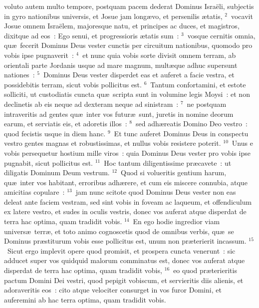 \bchapter
{}voluto autem multo tempore, postquam pacem dederat Dominus Isra\"eli, subjectis in gyro nationibus universis, et Josue jam long\ae vo, et persenilis \ae tatis,
${}^{2}$~vocavit Josue omnem Isra\"elem, majoresque natu, et principes ac duces, et magistros, dixitque ad eos~: Ego senui, et progressioris \ae tatis sum~:
${}^{3}$~vosque cernitis omnia, qu\ae\ fecerit Dominus Deus vester cunctis per circuitum nationibus, quomodo pro vobis ipse pugnaverit~:
${}^{4}$~et nunc quia vobis sorte divisit omnem terram, ab orientali parte Jordanis usque ad mare magnum, mult\ae que adhuc supersunt nationes~:
${}^{5}$~Dominus Deus vester disperdet eas et auferet a facie vestra, et possidebitis terram, sicut vobis pollicitus est.
${}^{6}$~Tantum confortamini, et estote solliciti, ut custodiatis cuncta qu\ae\ scripta sunt in volumine legis Moysi~: et non declinetis ab eis neque ad dexteram neque ad sinistram~:
${}^{7}$~ne postquam intraveritis ad gentes qu\ae\ inter vos futur\ae\ sunt, juretis in nomine deorum earum, et serviatis eis, et adoretis illos~:
${}^{8}$~sed adh\ae reatis Domino Deo vestro~: quod fecistis usque in diem hanc.
${}^{9}$~Et tunc auferet Dominus Deus in conspectu vestro gentes magnas et robustissimas, et nullus vobis resistere poterit.
${}^{10}$~Unus e vobis persequetur hostium mille viros~: quia Dominus Deus vester pro vobis ipse pugnabit, sicut pollicitus est.
${}^{11}$~Hoc tantum diligentissime pr\ae cavete~: ut diligatis Dominum Deum vestrum.
${}^{12}$~Quod si volueritis gentium harum, qu\ae\ inter vos habitant, erroribus adh\ae rere, et cum eis miscere connubia, atque amicitias copulare~:
${}^{13}$~jam nunc scitote quod Dominus Deus vester non eas deleat ante faciem vestram, sed sint vobis in foveam ac laqueum, et offendiculum ex latere vestro, et sudes in oculis vestris, donec vos auferat atque disperdat de terra hac optima, quam tradidit vobis.
${}^{14}$~En ego hodie ingredior viam univers\ae\ terr\ae , et toto animo cognoscetis quod de omnibus verbis, qu\ae\ se Dominus pr\ae stiturum vobis esse pollicitus est, unum non pr\ae terierit incassum.
${}^{15}$~Sicut ergo implevit opere quod promisit, et prospera cuncta venerunt~: sic adducet super vos quidquid malorum comminatus est, donec vos auferat atque disperdat de terra hac optima, quam tradidit vobis,
${}^{16}$~eo quod pr\ae terieritis pactum Domini Dei vestri, quod pepigit vobiscum, et servieritis diis alienis, et adoraveritis eos~: cito atque velociter consurget in vos furor Domini, et auferemini ab hac terra optima, quam tradidit vobis.

